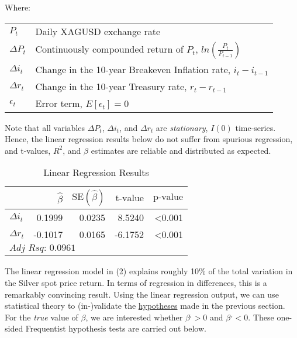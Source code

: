 \documentclass[
  12pt,
]{article}
\begin{document}
\begin{footnotesize}
Where:

\begin{tabular}{ll}

$P_t$ & Daily XAGUSD exchange rate\\
$\Delta P_t$ & Continuously compounded return of $\scriptstyle P_t$, $\scriptstyle ln \left( \frac{P_t}{P_{t-1}} \right)$\\
$\Delta i_t$ & Change in the 10-year Breakeven Inflation rate, $\scriptstyle i_t - i_{t-1}$\\
$\Delta r_t$ & Change in the 10-year Treasury rate, $\scriptstyle r_t - r_{t-1}$\\
$\epsilon_t$ & Error term, $E[\epsilon_t] = 0$\\

\end{tabular}
\end{footnotesize}

Note that all variables \(\Delta P_t\), \(\Delta i_t\), and
\(\Delta r_t\) are \emph{stationary}, \(I(0)\) time-series. Hence, the
linear regression results below do not suffer from spurious regression,
and t-values, \(R^2\), and \(\beta\) estimates are reliable and
distributed as expected.

\begin{table}[!h]

\caption{\label{tab:lm-fit}Linear Regression Results}
\centering
\begin{tabular}[t]{lrrrr}
\toprule
  & $\hat{\beta}$ & $\textrm{SE}(\hat{\beta})$ & $\textrm{t-value}$ & $\textrm{p-value}$\\
\midrule
$\Delta i_t$ & 0.1999 & 0.0235 & 8.5240 & <0.001\\
$\Delta r_t$ & -0.1017 & 0.0165 & -6.1752 & <0.001\\
\bottomrule
\multicolumn{5}{l}{\rule{0pt}{1em}$\textit{Adj Rsq: 0.0961}$}\\
\end{tabular}
\end{table}

The linear regression model in (2) explains roughly 10\% of the total
variation in the Silver spot price return. In terms of regression in
differences, this is a remarkably convincing result. Using the linear
regression output, we can use statistical theory to (in-)validate the
\protect\hyperlink{silver-spot-pricing-hypothesis}{hypotheses} made in
the previous section. For the \emph{true} value of \(\beta\), we are
interested whether \(\beta^{_i} > 0\) and \(\beta^{_r} < 0\). These
one-sided Frequentist hypothesis tests are carried out below.
\end{document}
